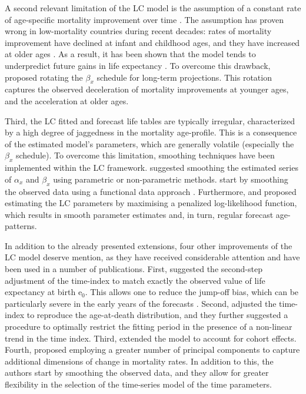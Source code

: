 \documentclass[Thesis]{subfiles}
\begin{document}
A second relevant limitation of the LC model is the assumption of a constant rate of age-specific mortality improvement over time \citep{lee2001evaluating}. The assumption has proven wrong in low-mortality countries during recent decades: rates of mortality improvement have declined at infant and childhood ages, and they have increased at older ages \citep{kannisto1994reductions,vaupel1998biodemographic,wilmoth1999rectangularization}. As a result, it has been shown that the model tends to underpredict future gains in life expectancy \citep{lee2001evaluating}. To overcome this drawback, \cite{li2013extending} proposed rotating the $\beta_x$ schedule for long-term projections. This rotation captures the observed deceleration of mortality improvements at younger ages, and the acceleration at older ages.

Third, the LC fitted and forecast life tables are typically irregular, characterized by a high degree of jaggedness in the mortality age-profile. This is a consequence of the estimated model's parameters, which are generally volatile (especially the $\beta_x$ schedule). To overcome this limitation, smoothing techniques have been implemented within the LC framework. \cite{renshaw2003forecasting} suggested smoothing the estimated series of $\alpha_{x}$ and $\beta_{x}$ using parametric or non-parametric methods. \cite{hyndman2007robust} start by smoothing the observed data using a functional data approach \citep{ramsay2005FDA}. Furthermore, \cite{delwarde2007smoothing} and \cite{currie2013smoothing} proposed estimating the LC parameters by maximising a penalized log-likelihood function, which results in smooth parameter estimates and, in turn, regular forecast age-patterns.  

In addition to the already presented extensions, four other improvements of the LC model deserve mention, as they have received considerable attention and have been used in a number of publications. First, \cite{lee2001evaluating} suggested the second-step adjustment of the time-index to match exactly the observed value of life expectancy at birth $\mathrm{e}_0$. This allows one to reduce the jump-off bias, which can be particularly severe in the early years of the forecasts \citep{lee2001evaluating}. Second, \cite{booth2002applying} adjusted the time-index to reproduce the age-at-death distribution, and they further suggested a procedure to optimally restrict the fitting period in the presence of a non-linear trend in the time index. Third, \cite{renshaw2006cohort} extended the model to account for cohort effects. Fourth, \cite{hyndman2007robust} proposed employing a greater number of principal components to capture additional dimensions of change in mortality rates. In addition to this, the authors start by smoothing the observed data, and they allow for greater flexibility in the selection of the time-series model of the time parameters.   
\end{document}
